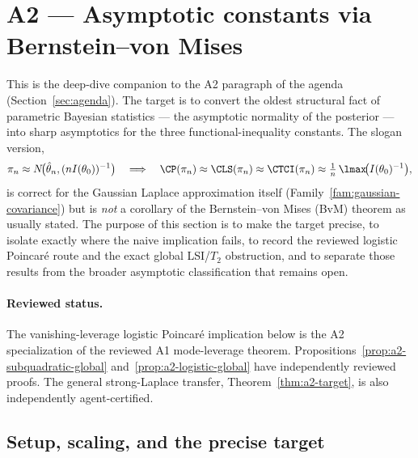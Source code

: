 \documentclass[../../main.tex]{subfiles}
\begin{document}
\section{A2 --- Asymptotic constants via Bernstein--von Mises}
\label{sec:a2}

This is the deep-dive companion to the A2 paragraph of the agenda (Section~\ref{sec:agenda}).
The target is to convert the oldest structural fact of parametric Bayesian statistics --- the
asymptotic normality of the posterior --- into sharp asymptotics for the three
functional-inequality constants. The slogan version,
\[
  \pi_n\approx N\!\big(\hat\theta_n,(nI(\theta_0))^{-1}\big)
  \quad\Longrightarrow\quad
  \CP(\pi_n)\approx\CLS(\pi_n)\approx\CTCI(\pi_n)\approx\tfrac1n\,\lmax\!\big(I(\theta_0)^{-1}\big),
\]
is correct for the Gaussian Laplace approximation itself (Family~\ref{fam:gaussian-covariance})
but is \emph{not} a corollary of the Bernstein--von Mises (BvM) theorem as usually stated. The
purpose of this section is to make the target precise, to isolate exactly where the naive
implication fails, to record the reviewed logistic Poincar\'e route and the exact global
LSI/$T_2$ obstruction, and to separate those results from the broader asymptotic classification
that remains open.

\paragraph{Reviewed status.}
The vanishing-leverage logistic Poincar\'e implication below is the A2 specialization of the
reviewed A1 mode-leverage theorem. Propositions~\ref{prop:a2-subquadratic-global}
and~\ref{prop:a2-logistic-global} have independently reviewed proofs. The general
strong-Laplace transfer, Theorem~\ref{thm:a2-target}, is also independently agent-certified.

\subsection{Setup, scaling, and the precise target}
\label{subsec:a2-setup}
\end{document}
